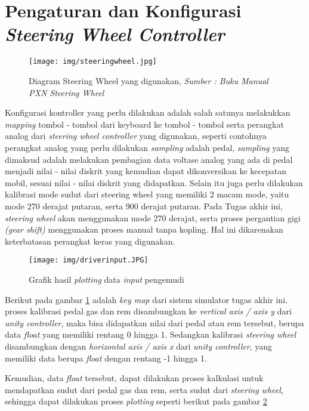 \section{Pengaturan dan Konfigurasi \textit{Steering Wheel Controller}}
\label{steeringwheelconf}
\vspace{1ex}
    \begin{figure}  [!htb]
	    \captionsetup{justification=centering}
	    \texttt{[image: img/steeringwheel.jpg]}
	    \caption{Diagram Steering Wheel yang digunakan, \textit{Sumber : Buku Manual PXN Steering Wheel}}
	    \label{fig: 3_28}
    \end{figure}

	Konfigurasi kontroller yang perlu dilakukan adalah salah satunya melakukkan \textit{mapping} tombol - tombol dari keyboard ke tombol - tombol serta perangkat analog dari \textit{steering wheel controller} yang digunakan, seperti contohnya perangkat analog yang perlu dilakukan \textit{sampling} adalah pedal, \textit{sampling} yang dimaksud adalah melakukan pembagian data voltase analog yang ada di pedal menjadi nilai - nilai diskrit yang kemudian dapat dikonversikan ke kecepatan mobil, sesuai nilai - nilai diskrit yang didapatkan. Selain itu juga perlu dilakukan kalibrasi mode sudut dari steering wheel yang memiliki 2 macam mode, yaitu mode 270 derajat putaran, serta 900 derajat putaran. 
	Pada Tugas akhir ini, \textit{steering wheel} akan menggunakan mode 270 derajat, serta proses pergantian gigi \textit{(gear shift)} menggunakan proses manual tanpa kopling. Hal ini dikarenakan keterbatasan perangkat keras yang digunakan.
	
	\begin{figure}  [!htb]
	    \captionsetup{justification=centering}
	    \texttt{[image: img/driverinput.JPG]}
	    \caption{Grafik hasil \textit{plotting} data \textit{input} pengemudi}
	    \label{fig: 3_29}
    \end{figure}
    
    Berikut pada gambar \ref{fig: 3_28} adalah \textit{key map} dari sistem simulator tugas akhir ini. proses kalibrasi pedal gas dan rem disambungkan ke \textit{vertical axis / axis y} dari \textit{unity controller}, maka bisa didapatkan nilai dari pedal atau rem tersebut, berupa data \textit{float} yang memiliki rentang 0 hingga 1. Sedangkan kalibrasi \textit{steering wheel} disambungkan dengan \textit{horizontal axis / axis x} dari \textit{unity controller}, yang memiliki data berupa \textit{float} dengan rentang -1 hingga 1.
    \par Kemudian, data \textit{float} tersebut, dapat dilakukan proses kalkulasi untuk mendapatkan sudut dari pedal gas dan rem, serta sudut dari \textit{steering wheel}, sehingga dapat dilakukan proses \textit{plotting} seperti berikut pada gambar \ref{fig: 3_29}
    
